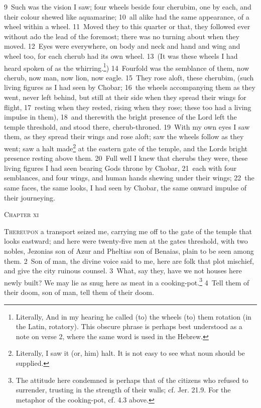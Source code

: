 \documentclass[10pt]{book} %
\begin{document}
\textcolor{benred8}{9}~Such was the vision I saw; four wheels beside four cherubim, one by each, and their colour shewed like aquamarine; \textcolor{benred8}{10}~all alike had the same appearance, of a wheel within a wheel. \textcolor{benred8}{11}~Moved they to this quarter or that, they followed ever without ado the lead of the foremost; there was no turning about when they moved. \textcolor{benred8}{12}~Eyes were everywhere, on body and neck and hand and wing and wheel too, for each cherub had its own wheel. \textcolor{benred8}{13}~(It was these wheels I had heard spoken of as the whirring.\footnote[2]{Literally, \textasciigrave And in my hearing he called (to) the wheels (to) them rotation (in the Latin, rotatory)\textquotesingle . This obscure phrase is perhaps best understood as a note on verse 2, where the same word is used in the Hebrew.}) \textcolor{benred8}{14}~Fourfold was the semblance of them, now cherub, now man, now lion, now eagle. \textcolor{benred8}{15}~They rose aloft, these cherubim, (such living figures as I had seen by Chobar; \textcolor{benred8}{16}~the wheels accompanying them as they went, never left behind, but still at their side when they spread their wings for flight, \textcolor{benred8}{17}~resting when they rested, rising when they rose; these too had a living impulse in them), \textcolor{benred8}{18}~and therewith the bright presence of the Lord left the temple threshold, and stood there, cherub-throned. \textcolor{benred8}{19}~With my own eyes I saw them, as they spread their wings and rose aloft; saw the wheels follow as they went; saw a halt made\footnote[3]{Literally, \textasciigrave I saw it (or, him) halt\textquotesingle . It is not easy to see what noun should be supplied.} at the eastern gate of the temple, and the Lord\textquotesingle s bright presence resting above them. \textcolor{benred8}{20}~Full well I knew that cherubs they were, these living figures I had seen bearing God\textquotesingle s throne by Chobar, \textcolor{benred8}{21}~each with four semblances, and four wings, and human hands shewing under their wings; \textcolor{benred8}{22}~the same faces, the same looks, I had seen by Chobar, the same onward impulse of their journeying.
\begin{large}\begin{center}\textsc{Chapter xi}\end{center}\end{large}
\lettrine[lines=2]{T}{hereupon} a transport seized me, carrying me off to the gate of the temple that looks eastward; and here were twenty-five men at the gate\textquotesingle s threshold, with two nobles, Jezonias son of Azur and Pheltias son of Benaias, plain to be seen among them. \textcolor{benred8}{2}~Son of man, the divine voice said to me, here are folk that plot mischief, and give the city ruinous counsel. \textcolor{benred8}{3}~What, say they, have we not houses here newly built? We may lie as snug here as meat in a cooking-pot.\footnote[1]{The attitude here condemned is perhaps that of the citizens who refused to surrender, trusting in the strength of their walls; cf. Jer. 21.9. For the metaphor of the cooking-pot, cf. 4.3 above.} \textcolor{benred8}{4}~Tell them of their doom, son of man, tell them of their doom.
\end{document}
